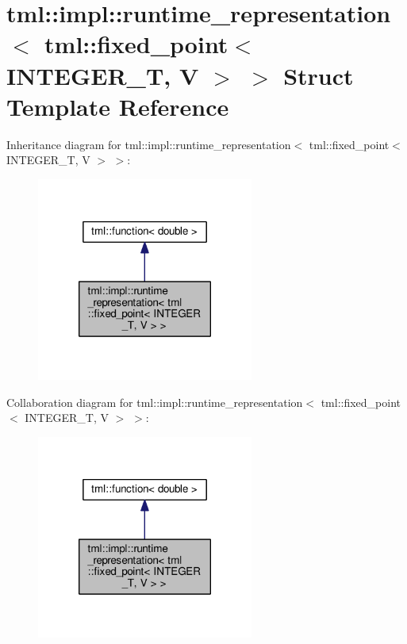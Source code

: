 \hypertarget{structtml_1_1impl_1_1runtime__representation_3_01tml_1_1fixed__point_3_01_i_n_t_e_g_e_r___t_00_01_v_01_4_01_4}{\section{tml\+:\+:impl\+:\+:runtime\+\_\+representation$<$ tml\+:\+:fixed\+\_\+point$<$ I\+N\+T\+E\+G\+E\+R\+\_\+\+T, V $>$ $>$ Struct Template Reference}
\label{structtml_1_1impl_1_1runtime__representation_3_01tml_1_1fixed__point_3_01_i_n_t_e_g_e_r___t_00_01_v_01_4_01_4}
}


Inheritance diagram for tml\+:\+:impl\+:\+:runtime\+\_\+representation$<$ tml\+:\+:fixed\+\_\+point$<$ I\+N\+T\+E\+G\+E\+R\+\_\+\+T, V $>$ $>$\+:
\nopagebreak
\begin{figure}[H]
\begin{center}
\leavevmode
\includegraphics[width=202pt]{structtml_1_1impl_1_1runtime__representation_3_01tml_1_1fixed__point_3_01_i_n_t_e_g_e_r___t_00_01_v_01_4_01_4__inherit__graph}
\end{center}
\end{figure}


Collaboration diagram for tml\+:\+:impl\+:\+:runtime\+\_\+representation$<$ tml\+:\+:fixed\+\_\+point$<$ I\+N\+T\+E\+G\+E\+R\+\_\+\+T, V $>$ $>$\+:
\nopagebreak
\begin{figure}[H]
\begin{center}
\leavevmode
\includegraphics[width=202pt]{structtml_1_1impl_1_1runtime__representation_3_01tml_1_1fixed__point_3_01_i_n_t_e_g_e_r___t_00_01_v_01_4_01_4__coll__graph}
\end{center}
\end{figure}
